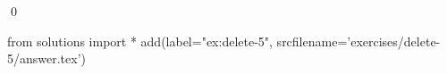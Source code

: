 
\begin{ex} 
  \label{ex:delete-5}
  
  \qed
\end{ex} 
\begin{python0}
from solutions import *
add(label="ex:delete-5",
    srcfilename='exercises/delete-5/answer.tex') 
\end{python0}
